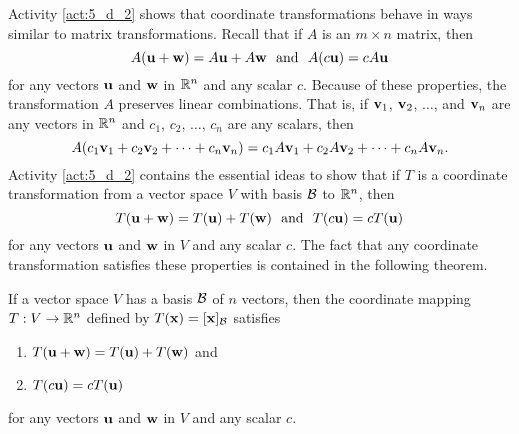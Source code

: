 Activity \ref{act:5_d_2} shows that coordinate transformations behave in ways similar to matrix transformations. Recall that if $A$ is an $m \times n$ matrix, then  
\[A(\vu+\vw) = A\vu + A\vw \ \text{ and } \ A(c\vu) = cA\vu\]
for any vectors $\mathbf{u}$ and $\mathbf{w}$ in $\mathbb{R}^n$ and any scalar $c$. Because of these properties, the transformation $A$ preserves linear combinations. That is, if $\mathbf{v}_1$, $\mathbf{v}_2$, $\ldots$, and $\mathbf{v}_n$ are any vectors in $\mathbb{R}^n$ and $c_1$, $c_2$, $\ldots$, $c_n$ are any scalars, then 
\[A(c_1 \mathbf{v}_1 + c_2 \mathbf{v}_2 + \cdots + c_n \mathbf{v}_n) = c_1 A\mathbf{v}_1 + c_2 A\mathbf{v}_2 + \cdots + c_n A\mathbf{v}_n.\]
Activity \ref{act:5_d_2} contains the essential ideas to show that if $T$ is a coordinate transformation from a vector space $V$ with basis $\mathcal{B}$ to $\mathbb{R}^n$, then 
\[T(\vu+\vw) = T(\vu) + T(\vw) \ \text{ and } \ T(c\vu) = cT(\vu)\]
for any vectors $\mathbf{u}$ and $\mathbf{w}$ in $V$ and any scalar $c$. The fact that any coordinate transformation satisfies these properties is contained in the following theorem.
 
\begin{theorem} \label{thm:5_d_5} If a vector space $V$ has a basis $\mathcal{B}$ of $n$ vectors, then the coordinate mapping $T : V \to \mathbb{R}^n$ defined by $T(\mathbf{x}) = [\mathbf{x}]_{\mathcal{B}}$ satisfies
\begin{enumerate}
\item $T(\mathbf{u} + \mathbf{w}) = T(\mathbf{u}) + T(\mathbf{w})$ and
\item $T(c\mathbf{u}) = cT(\mathbf{u})$
\end{enumerate}
for any vectors $\mathbf{u}$ and $\mathbf{w}$ in $V$ and any scalar $c$. 
\end{theorem}


